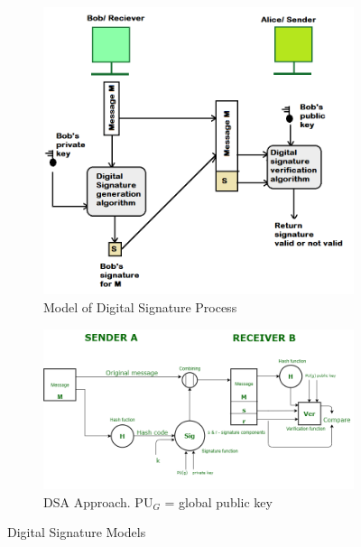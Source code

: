 \begin{figure}[h!]
    \centering
    \begin{subfigure}[t]{0.3\textwidth}
        \centering
        \includegraphics[width=\textwidth]{img/digsign.png}
        \caption{Model of Digital Signature Process}
    \end{subfigure}
    \hspace{0.1\textwidth}
    \begin{subfigure}[t]{0.5\textwidth}
        \centering
        \includegraphics[width=\textwidth]{img/dsa.png}
        \caption{DSA Approach. PU$_G$ = global public key}
    \end{subfigure}
    \caption{Digital Signature Models}
    \label{fig:digsign-dsa}
\end{figure}

